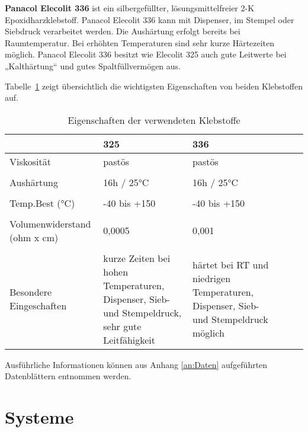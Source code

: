 {\bf Panacol Elecolit 336} ist ein silbergefüllter, lösungsmittelfreier 2-K Epoxidharzklebstoff. Panacol Elecolit 336 kann mit Dispenser, im Stempel oder Siebdruck verarbeitet werden. Die Aushärtung erfolgt bereits bei Raumtemperatur. Bei erhöhten Temperaturen sind sehr kurze Härtezeiten möglich. Panacol Elecolit 336 besitzt wie Elecolit 325 auch gute Leitwerte bei „Kalthärtung“ und gutes Spaltfüllvermögen aus.

Tabelle~\ref{tab:klebereigenschaften} zeigt übersichtlich die wichtigsten Eigenschaften von beiden Klebstoffen auf.

\begin{table}[H]
\begin{center}
    \begin{tabular}{p{4cm}|p{5cm}|p{5cm} l|l|l}
    \hline
      &               325                    & 336 \\
    \hline
        Viskosität  & pastös    & pastös \\
        &\\
        Aushärtung                   &  16h / 25°C                           &16h / 25°C \\
        &\\
        Temp.Best (°C)               & -40 bis +150                           &  -40 bis +150 \\
        &\\
        Volumenwiderstand (ohm x cm) & 0,0005                                 & 0,001 \\
        &\\
        Besondere Eingeschaften      & kurze Zeiten bei hohen Temperaturen, Dispenser, Sieb- und Stempeldruck, sehr gute Leitfähigkeit   &  härtet bei RT und niedrigen Temperaturen, Dispenser, Sieb- und Stempeldruck möglich \\
        \hline
    \end{tabular}
    \caption{Eigenschaften der verwendeten Klebstoffe}
    \label{tab:klebereigenschaften}
\end{center}
\end{table}

Ausführliche Informationen können aus Anhang \ref{an:Daten} aufgeführten Datenblättern entnommen werden.

\section{Systeme}


